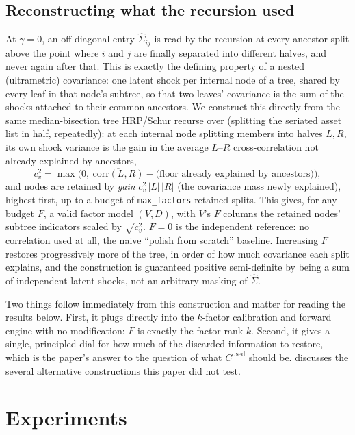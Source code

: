 \documentclass[11pt]{article}
\begin{document}
\subsection{Reconstructing what the recursion used}
\label{sec:tree}

At $\gamma=0$, an off-diagonal entry $\hat\Sigma_{ij}$ is read by the
recursion at every ancestor split above the point where $i$ and $j$ are
finally separated into different halves, and never again after that. This is
exactly the defining property of a nested (ultrametric) covariance: one
latent shock per internal node of a tree, shared by every leaf in that
node's subtree, so that two leaves' covariance is the sum of the shocks
attached to their common ancestors. We construct this directly from the same
median-bisection tree HRP/Schur recurse over (splitting the seriated asset
list in half, repeatedly): at each internal node splitting members into
halves $L,R$, its own shock variance is the gain in the average $L$--$R$
cross-correlation not already explained by ancestors,
\[
  c_v^2 = \max\!\big(0,\ \overline{\mathrm{corr}(L,R)} - \text{(floor already explained by ancestors)}\big),
\]
and nodes are retained by \emph{gain} $c_v^2\,|L|\,|R|$ (the covariance mass
newly explained), highest first, up to a budget of \texttt{max\_factors}
retained splits. This gives, for any budget $F$, a valid factor model
$(V,D)$, with $V$'s $F$ columns the retained nodes' subtree indicators
scaled by $\sqrt{c_v^2}$. $F=0$ is the independent reference: no correlation
used at all, the naive ``polish from scratch'' baseline. Increasing $F$
restores progressively more of the tree, in order of how much covariance
each split explains, and the construction is guaranteed positive
semi-definite by being a sum of independent latent shocks, not an arbitrary
masking of $\hat\Sigma$.

Two things follow immediately from this construction and matter for reading
the results below. First, it plugs directly into the $k$-factor calibration
and forward engine with no modification: $F$ is exactly the factor rank $k$.
Second, it gives a single, principled dial for how much of the discarded
information to restore, which is the paper's answer to the question of what
$C^{\mathrm{used}}$ should be.  discusses the several
alternative constructions this paper did not test.

\section{Experiments}
\end{document}

